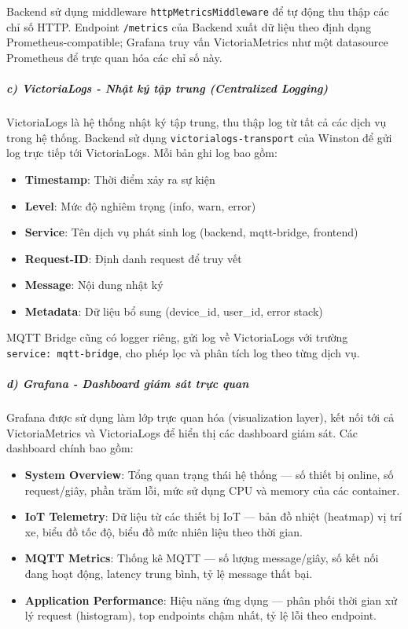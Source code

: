 \documentclass[13pt,a4paper]{extarticle}
\renewcommand{\\}{\thesislongtableorignewline\hline}%
\providecommand{\tightlist}{%
  \setlength{\itemsep}{0pt}\setlength{\parskip}{0pt}}
\begin{document}
Backend sử dụng middleware \texttt{httpMetricsMiddleware} để tự động thu
thập các chỉ số HTTP. Endpoint \texttt{/metrics} của Backend xuất dữ
liệu theo định dạng Prometheus-compatible; Grafana truy vấn
VictoriaMetrics như một datasource Prometheus để trực quan hóa các chỉ
số này.

\subparagraph{c) VictoriaLogs - Nhật ký tập trung (Centralized
Logging)}\label{c-victorialogs---nhux1eadt-kuxfd-tux1eadp-trung-centralized-logging}

VictoriaLogs là hệ thống nhật ký tập trung, thu thập log từ tất cả các
dịch vụ trong hệ thống. Backend sử dụng \texttt{victorialogs-transport}
của Winston để gửi log trực tiếp tới VictoriaLogs. Mỗi bản ghi log bao
gồm:

\begin{itemize}
\tightlist
\item
  \textbf{Timestamp}: Thời điểm xảy ra sự kiện
\item
  \textbf{Level}: Mức độ nghiêm trọng (info, warn, error)
\item
  \textbf{Service}: Tên dịch vụ phát sinh log (backend, mqtt-bridge,
  frontend)
\item
  \textbf{Request-ID}: Định danh request để truy vết
\item
  \textbf{Message}: Nội dung nhật ký
\item
  \textbf{Metadata}: Dữ liệu bổ sung (device\_id, user\_id, error stack)
\end{itemize}

MQTT Bridge cũng có logger riêng, gửi log về VictoriaLogs với trường
\texttt{service:\ mqtt-bridge}, cho phép lọc và phân tích log theo từng
dịch vụ.

\subparagraph{d) Grafana - Dashboard giám sát trực
quan}\label{d-grafana---dashboard-giuxe1m-suxe1t-trux1ef1c-quan}

Grafana được sử dụng làm lớp trực quan hóa (visualization layer), kết
nối tới cả VictoriaMetrics và VictoriaLogs để hiển thị các dashboard
giám sát. Các dashboard chính bao gồm:

\begin{itemize}
\tightlist
\item
  \textbf{System Overview}: Tổng quan trạng thái hệ thống --- số thiết
  bị online, số request/giây, phần trăm lỗi, mức sử dụng CPU và memory
  của các container.
\item
  \textbf{IoT Telemetry}: Dữ liệu từ các thiết bị IoT --- bản đồ nhiệt
  (heatmap) vị trí xe, biểu đồ tốc độ, biểu đồ mức nhiên liệu theo thời
  gian.
\item
  \textbf{MQTT Metrics}: Thống kê MQTT --- số lượng message/giây, số kết
  nối đang hoạt động, latency trung bình, tỷ lệ message thất bại.
\item
  \textbf{Application Performance}: Hiệu năng ứng dụng --- phân phối
  thời gian xử lý request (histogram), top endpoints chậm nhất, tỷ lệ
  lỗi theo endpoint.
\end{itemize}
\end{document}
